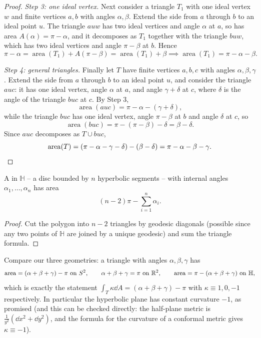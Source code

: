 \documentclass[a4paper]{scrartcl}
\newcommand{\HH}{\mathbb{H}}
\begin{document}
\begin{proof}
    \emph{Step 3: one ideal vertex.} Next consider a triangle $T_1$ with one ideal vertex $w$ and finite vertices $a, b$ with angles $\alpha, \beta$. Extend the side from $a$ through $b$ to an ideal point $u$. The triangle $a u w$ has two ideal vertices and angle $\alpha$ at $a$, so has area $A(\alpha) = \pi - \alpha$, and it decomposes as $T_1$ together with the triangle $b u w$, which has two ideal vertices and angle $\pi - \beta$ at $b$. Hence
    $$
    \pi - \alpha = \operatorname{area}(T_1) + A(\pi - \beta) = \operatorname{area}(T_1) + \beta \implies \operatorname{area}(T_1) = \pi - \alpha - \beta.
    $$

    \emph{Step 4: general triangles.} Finally let $T$ have finite vertices $a, b, c$ with angles $\alpha, \beta, \gamma$. Extend the side from $a$ through $b$ to an ideal point $u$, and consider the triangle $a u c$: it has one ideal vertex, angle $\alpha$ at $a$, and angle $\gamma + \delta$ at $c$, where $\delta$ is the angle of the triangle $b u c$ at $c$. By Step 3,
    $$
    \operatorname{area}(auc) = \pi - \alpha - (\gamma + \delta),
    $$
    while the triangle $buc$ has one ideal vertex, angle $\pi - \beta$ at $b$ and angle $\delta$ at $c$, so
    $$
    \operatorname{area}(buc) = \pi - (\pi - \beta) - \delta = \beta - \delta.
    $$
    Since $auc$ decomposes as $T \cup buc$,
    $$
    \operatorname{area}(T) = \left(\pi - \alpha - \gamma - \delta\right) - \left(\beta - \delta\right) = \pi - \alpha - \beta - \gamma. \qedhere
    $$
\end{proof}

\begin{corollary}
    A  in $\HH$ -- a disc bounded by $n$ hyperbolic segments -- with internal angles $\alpha_1, \dots, \alpha_n$ has area
    $$
    (n - 2)\pi - \sum_{i = 1}^n \alpha_i.
    $$
\end{corollary}
\begin{proof}
    Cut the polygon into $n - 2$ triangles by geodesic diagonals (possible since any two points of $\HH$ are joined by a unique geodesic) and sum the triangle formula.
\end{proof}

Compare our three geometries: a triangle with angles $\alpha, \beta, \gamma$ has
$$
\operatorname{area} = (\alpha + \beta + \gamma) - \pi \text{ on } S^2, \qquad \alpha + \beta + \gamma = \pi \text{ on } \R^2, \qquad \operatorname{area} = \pi - (\alpha + \beta + \gamma) \text{ on } \HH,
$$
which is exactly the statement $\int_T \kappa \dd A = (\alpha + \beta + \gamma) - \pi$ with $\kappa \equiv 1, 0, -1$ respectively. In particular the hyperbolic plane has constant curvature $-1$, as promised (and this can be checked directly: the half-plane metric is $\frac{1}{y^2}(\dd x^2 + \dd y^2)$, and the formula for the curvature of a conformal metric gives $\kappa \equiv -1$).
\end{document}
